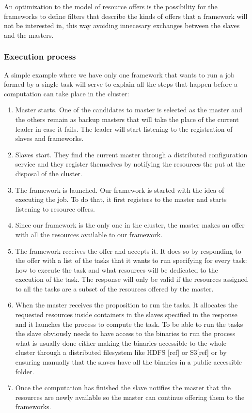 \documentclass{svjour3}                     %
\begin{document}
An optimization to the model of resource offers is the possibility for the frameworks
to define filters that describe the kinds of offers that a framework will not be interested
in, this way avoiding innecesary exchanges between the slaves and the masters.

\subsubsection{Execution process}

A simple example where we have only one framework that wants to run a 
job formed by a single task will serve to explain all the steps that happen
before a computation can take place in the cluster:

\begin{enumerate}
\item Master starts. One of the candidates to master is selected as the master and 
the others remain as backup masters that will take the place of the current leader in
case it fails. The leader will start listening to the registration of slaves and 
frameworks.
\item Slaves start. They find the current master through a distributed configuration 
service and they register themselves by notifying the resources the put at the disposal
of the cluster.
\item The framework is launched. Our framework is started with the idea of executing 
the job. To do that, it first registers to the master and starts listening to resource
offers.
\item Since our framework is the only one in the cluster, the master makes an offer with
all the resources available to our framework.
\item The framework receives the offer and accepts it. It does so by responding to the
offer with a list of the tasks that it wants to run specifying for every task: how to 
execute the task and what resources will be dedicated to the execution of the task.
The response will only be valid if the resources assigned to all the tasks are a subset
of the resources offered by the master.
\item When the master receives the proposition to run the tasks. It allocates the requested
resources inside containers in the slaves specified in the response and it launches the
process to compute the task. To be able to run the tasks the slave obviously needs to 
have access to the binaries to run the process what is usually done either making the
binaries accessible to the whole cluster through a distributed filesystem like HDFS [ref]
or S3[ref] or by ensuring manually that the slaves have all the binaries in a public
accessible folder.
\item Once the computation has finished the slave notifies the master that the resources
are newly available so the master can continue offering them to the frameworks.
\end{enumerate}
\end{document}
